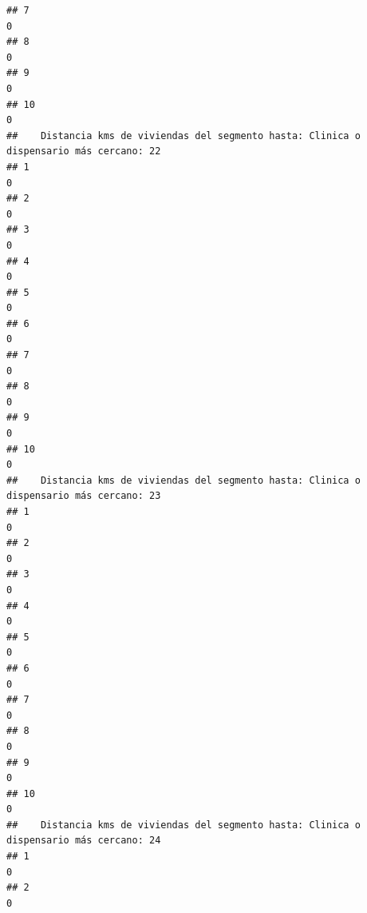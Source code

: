\documentclass[11pt,]{article}
\begin{document}
\begin{verbatim}
## 7                                                                                     0
## 8                                                                                     0
## 9                                                                                     0
## 10                                                                                    0
##    Distancia kms de viviendas del segmento hasta: Clinica o dispensario más cercano: 22
## 1                                                                                     0
## 2                                                                                     0
## 3                                                                                     0
## 4                                                                                     0
## 5                                                                                     0
## 6                                                                                     0
## 7                                                                                     0
## 8                                                                                     0
## 9                                                                                     0
## 10                                                                                    0
##    Distancia kms de viviendas del segmento hasta: Clinica o dispensario más cercano: 23
## 1                                                                                     0
## 2                                                                                     0
## 3                                                                                     0
## 4                                                                                     0
## 5                                                                                     0
## 6                                                                                     0
## 7                                                                                     0
## 8                                                                                     0
## 9                                                                                     0
## 10                                                                                    0
##    Distancia kms de viviendas del segmento hasta: Clinica o dispensario más cercano: 24
## 1                                                                                     0
## 2                                                                                     0

\end{verbatim}
\end{document}
